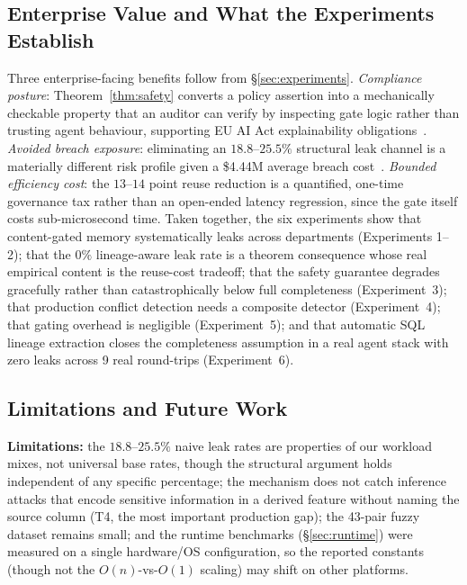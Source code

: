 \documentclass[nolineno]{ieeeaccess}
\begin{document}
\subsection{Enterprise Value and What the Experiments Establish}

Three enterprise-facing benefits follow from \S\ref{sec:experiments}.
\emph{Compliance posture}: Theorem~\ref{thm:safety} converts a policy
assertion into a mechanically checkable property that an auditor can verify
by inspecting gate logic rather than trusting agent behaviour, supporting EU
AI Act explainability obligations~\cite{euaiact2024}.
\emph{Avoided breach exposure}: eliminating an $18.8$--$25.5\%$ structural
leak channel is a materially different risk profile given a \$4.44M average
breach cost~\cite{ibm2025breach}.
\emph{Bounded efficiency cost}: the $13$--$14$ point reuse reduction is a
quantified, one-time governance tax rather than an open-ended latency
regression, since the gate itself costs sub-microsecond time.
Taken together, the six experiments show that content-gated memory
systematically leaks across departments (Experiments 1--2); that the
$0\%$ lineage-aware leak rate is a theorem consequence whose real empirical
content is the reuse-cost tradeoff; that the safety guarantee degrades
gracefully rather than catastrophically below full completeness
(Experiment~3); that production conflict detection needs a composite
detector (Experiment~4); that gating overhead is negligible
(Experiment~5); and that automatic SQL lineage extraction closes the
completeness assumption in a real agent stack with zero leaks across 9
real round-trips (Experiment~6).

\subsection{Limitations and Future Work}

\textbf{Limitations:} the $18.8$--$25.5\%$ naive leak rates are properties
of our workload mixes, not universal base rates, though the structural
argument holds independent of any specific percentage; the mechanism does
not catch inference attacks that encode sensitive information in a derived
feature without naming the source column (T4, the most important production
gap); the 43-pair fuzzy dataset remains small; and the runtime benchmarks
(\S\ref{sec:runtime}) were measured on a single hardware/OS configuration,
so the reported constants (though not the $O(n)$-vs-$O(1)$ scaling) may
shift on other platforms.
\end{document}
